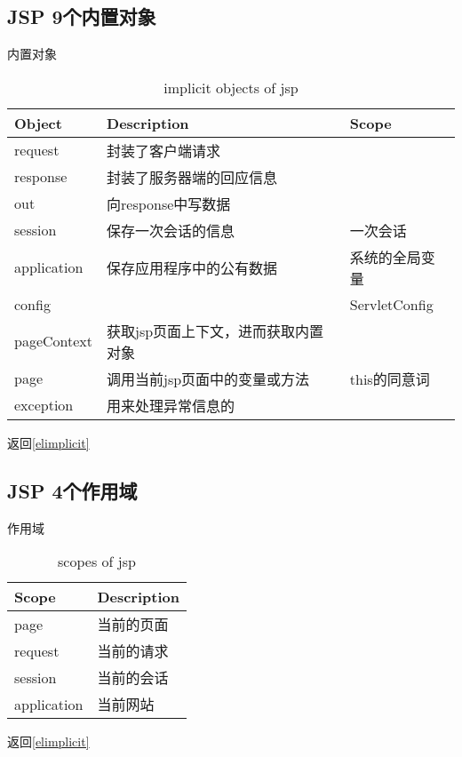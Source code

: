 \documentclass{beamer}
\begin{document}
\subsection{JSP 9个内置对象}
\begin{frame}{内置对象}
\label{implicitobj}
\begin{table}
\begin{tabular}{lll}
\toprule
\textbf{Object}&\textbf{Description}&\textbf{Scope}\\
\midrule
request&封装了客户端请求&\\
response&封装了服务器端的回应信息&\\
out&向response中写数据&\\
session&保存一次会话的信息&一次会话\\
application&保存应用程序中的公有数据&系统的全局变量\\
config&&ServletConfig\\
pageContext&获取jsp页面上下文，进而获取内置对象&\\
page&调用当前jsp页面中的变量或方法&this的同意词\\
exception&用来处理异常信息的&\\
\bottomrule
\end{tabular}
\caption{implicit objects of jsp}

\end{table}
返回\ref{elimplicit}
\end{frame}
\subsection{JSP 4个作用域}
\begin{frame}{作用域}
\begin{table}
\label{scope}
\begin{tabular}{ll}
\toprule
\textbf{Scope}&\textbf{Description}\\
\midrule
page&当前的页面\\
request&当前的请求\\
session&当前的会话\\
application&当前网站\\
\bottomrule
\end{tabular}
\caption{scopes of jsp}
\end{table}
返回\ref{elimplicit}
\end{frame}
\end{document}
